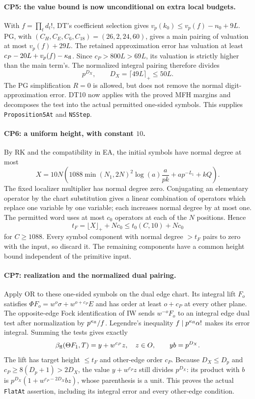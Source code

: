 \documentclass[11pt,a4paper]{article}
\numberwithin{equation}{section}
\theoremstyle{remark}\newtheorem{remark}[theorem]{Remark}
\begin{document}
\paragraph{CP5: the value bound is now unconditional on extra local budgets.}
With $f=\prod_td_t!$, DT's coefficient selection gives
$v_p(k_0)\le v_p(f)-n_0+9L$.
PG, with $(C_H,C_E,C_6,C_{18})=(26,2,24,60)$, gives a main pairing
of valuation at most $v_p(f)+29L$. The retained approximation error
has valuation at least $c_P-20L+v_p(f)-\kappa_{\rm fl}$.
Since $c_P>800L>69L$, its valuation is strictly higher than the main
term's. The normalized integral pairing therefore divides
\[
 p^{D_X},\qquad D_X=\lceil49L\rceil_+\le50L.           \tag{CP.6}
\]
The PG simplification $R=0$ is allowed, but does not remove the normal
digit-approximation error. DT10 now applies with the proved MFH
margins and decomposes the test into the actual permitted one-sided
symbols. This supplies \texttt{Proposition5At} and \texttt{NSStep}.

\paragraph{CP6: a uniform height, with constant $10$.}
By RK and the compatibility in EA, the initial symbols have normal
degree at most
\[
 X=10N\left(1088\min(N_1,2N)^2\log(a)\frac{a}{pk}
              +ap^{-L_1}+kQ\right).
\]
The fixed localizer multiplier has normal degree zero. Conjugating
an elementary operator by the chart substitution gives a linear
combination of operators which replace one variable by one variable;
each increases normal degree by at most one. The permitted word uses
at most $c_0$ operators at each of the $N$ positions. Hence
\[
 t_F=\lfloor X\rfloor_++Nc_0\le t_0(C,10)+Nc_0
\]
for $C\ge1088$. Every symbol component with normal degree $>t_F$
pairs to zero with the input, so discard it. The remaining components
have a common height bound independent of the primitive input.

\paragraph{CP7: realization and the normalized dual pairing.}
Apply OR to these one-sided symbols on the dual edge chart. Its
integral lift $F_o$ satisfies
$\Phi F_o=w^o\sigma+ w^{o+c_P}E$ and has order at least $o+c_P$
at every other plane. The opposite-edge Fock identification of IW
sends $w^{-o}F_o$ to an integral edge dual test after normalization by
$p^{\kappa_{\rm fl}}/f$. Legendre's inequality
$f\mid p^{\kappa_{\rm fl}}\alpha!$ makes its error integral.
Summing the tests gives exactly
\[
 \beta_{\rm fl}(\Theta F_1,T)=y+w^{c_P}z,\quad z\in O,
 \qquad yb=p^{D_X}.
\]
The lift has target height $\le t_F$ and other-edge order $c_P$.
Because $D_X\le D_p$ and $c_P\ge8(D_p+1)>2D_X$,
the value $y+w^{c_P}z$ still divides $p^{D_X}$: its product with $b$
is $p^{D_X}(1+w^{c_P-2D_X}bz)$, whose parenthesis is a unit.
This proves the actual \texttt{FlatAt} assertion, including its
integral error and every other-edge condition.
\end{document}
